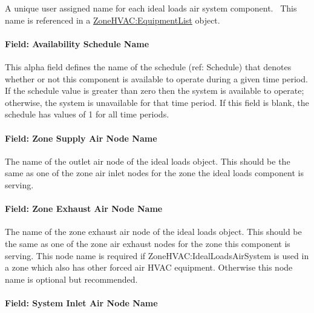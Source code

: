 A unique user assigned name for each ideal loads air system component.~ This name is referenced in a \hyperref[zonehvacequipmentlist]{ZoneHVAC:EquipmentList} object.

\paragraph{Field: Availability Schedule Name}\label{field-availability-schedule-name-020}

This alpha field defines the name of the schedule (ref: Schedule) that denotes whether or not this component is available to operate during a given time period. If the schedule value is greater than zero then the system is available to operate; otherwise, the system is unavailable for that time period. If this field is blank, the schedule has values of 1 for all time periods.

\paragraph{Field: Zone Supply Air Node Name}\label{field-zone-supply-air-node-name-001}

The name of the outlet air node of the ideal loads object. This should be the same as one of the zone air inlet nodes for the zone the ideal loads component is serving.

\paragraph{Field: Zone Exhaust Air Node Name}\label{field-zone-exhaust-air-node-name}

The name of the zone exhaust air node of the ideal loads object. This should be the same as one of the zone air exhaust nodes for the zone this component is serving. This node name is required if ZoneHVAC:IdealLoadsAirSystem is used in a zone which also has other forced air HVAC equipment. Otherwise this node name is optional but recommended.

\paragraph{Field: System Inlet Air Node Name}\label{system-inlet-air-node-name}

